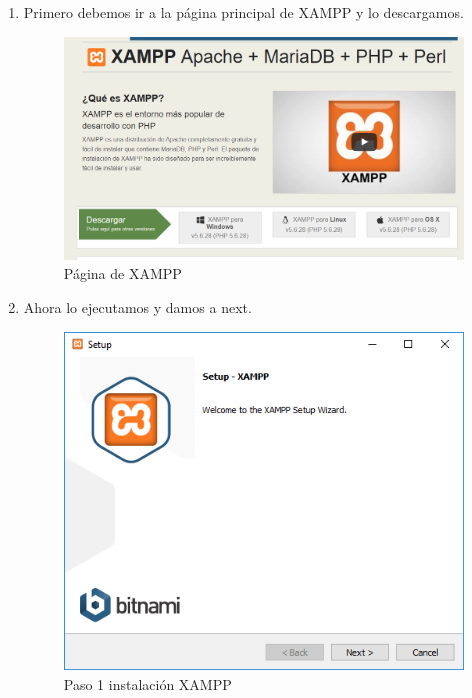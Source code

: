 \begin{enumerate}
	
	\item Primero debemos ir a la página principal de XAMPP \cite{xampp} y lo descargamos.
	
	\begin{figure}[H] %
		\centering
		\includegraphics[scale=0.3]{pics/xampp1}  %
		\caption{Página de XAMPP} \label{fig:XAMPP1}
	\end{figure}
	
	\item Ahora lo ejecutamos y damos a next.
	
	\begin{figure}[H] %
		\centering
		\includegraphics[scale=0.4]{pics/xampp2}  %
		\caption{Paso 1 instalación XAMPP} \label{fig:XAMPP2}
	\end{figure}
	

\end{enumerate}
